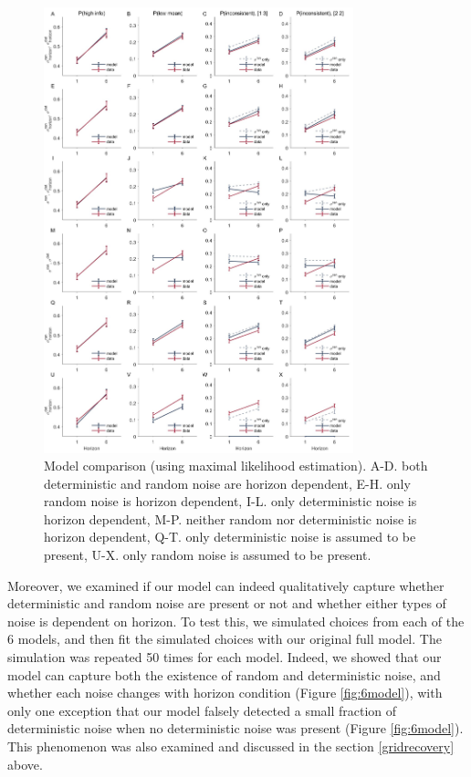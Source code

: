 \documentclass[12pt]{article}
\begin{document}
	\begin{figure}[hp]
	\begin{center}
		\includegraphics[width=0.8\textwidth]{figures/R1_2noise_6modelcomparison_map.jpg}
		\caption{
			Model comparison (using maximal likelihood estimation). A-D. both deterministic and random noise are horizon dependent, E-H. only random noise is horizon dependent, I-L. only deterministic noise is horizon dependent, M-P. neither random nor deterministic noise is horizon dependent, Q-T. only deterministic noise is assumed to be present, U-X. only random noise is assumed to be present.}
		\label{fig:posteriorcheck6models2}
	\end{center}
	\end{figure}
	

	Moreover, we examined if our model can indeed qualitatively capture whether deterministic and random noise are present or not and whether either types of noise is dependent on horizon. To test this, we simulated choices from each of the 6 models, and then fit the simulated choices with our original full model. The simulation was repeated 50 times for each model. Indeed, we showed that our model can capture both the existence of random and deterministic noise, and whether each noise changes with horizon condition (Figure \ref{fig:6model}), with only one exception that our model falsely detected a small fraction of deterministic noise when no deterministic noise was present (Figure \ref{fig:6model}). This phenomenon was also examined and discussed in the section \ref{gridrecovery} above.
	
\end{document}
